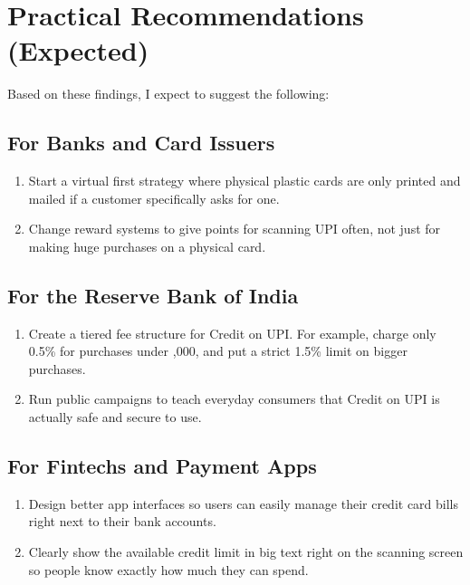 \section{Practical Recommendations (Expected)}

Based on these findings, I expect to suggest the following:

\subsection{For Banks and Card Issuers}

\begin{enumerate}
    \item Start a virtual first strategy where physical plastic cards are only printed and mailed if a customer specifically asks for one.
    \item Change reward systems to give points for scanning UPI often, not just for making huge purchases on a physical card.
\end{enumerate}

\subsection{For the Reserve Bank of India}

\begin{enumerate}
    \item Create a tiered fee structure for Credit on UPI. For example, charge only 0.5\% for purchases under ,000, and put a strict 1.5\% limit on bigger purchases.
    \item Run public campaigns to teach everyday consumers that Credit on UPI is actually safe and secure to use.
\end{enumerate}

\subsection{For Fintechs and Payment Apps}

\begin{enumerate}
    \item Design better app interfaces so users can easily manage their credit card bills right next to their bank accounts.
    \item Clearly show the available credit limit in big text right on the scanning screen so people know exactly how much they can spend.
\end{enumerate}
